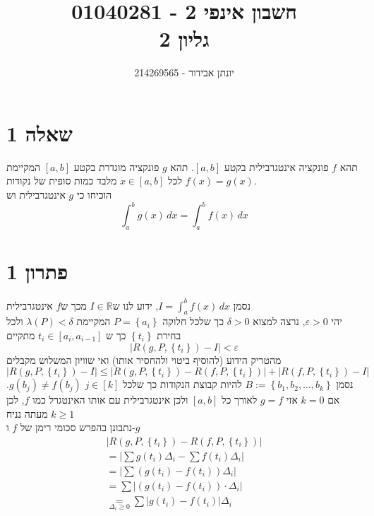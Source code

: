 \documentclass[12pt, titlepage]{article}
\title{חשבון אינפי 2 - 01040281 \\ גליון 2}
\author{יונתן אבידור - 214269565}
\begin{document}
\maketitle
\pagestyle{fancy}
\fancyhead{}
\part*{שאלה 1}
תהא $f$ פונקציה אינטגרבילית בקטע $\left[ a,b \right]$. תהא $g$ פונקציה מוגדרת בקטע $\left[ a,b \right]$ המקיימת $f\left( x \right)=g\left( x \right)$ לכל $x \in \left[ a,b \right]$ מלבד כמות סופית של נקודות.\\
הוכיחו כי $g$ אינטגרבילית וש
\[
	\int_{a}^{b} g\left( x \right)   \, dx =\int_{a}^{b} f\left( x \right)  \, dx 
    \]
\part*{פתרון 1}
נסמן $I=\int_{a}^{b} f\left( x \right) \, dx$, ידוע לנו ש$I\in \mathbb{R}$ מכך ש$f$ אינטגרבילית\\
יהי $\varepsilon>0$, נרצה למצוא $\delta>0$ כך שלכל חלוקה $P=\left\{ a_{i} \right\}$ המקיימת $\lambda \left( P \right)<\delta$ ולכל בחירת $\left\{ t_{i} \right\}$ כך ש $t_{i}\in \left[ a_{i},a_{i-1} \right]$ מתקיים
$$
\left| R\left( g,P,\left\{ t_{i} \right\}  \right) -I \right| <\varepsilon
$$
מהטריק הידוע (להוסיף ביטוי ולהחסיר אותו) ואי שוויון המשלוש מקבלים
$$
	\left| R\left( g,P,\left\{ t_{i} \right\}  \right)-I  \right| \leq \left| R\left( g,P,\left\{ t_{i} \right\}\right)  -R\left( f,P,\left\{ t_{i} \right\}   \right)  \right| + \left| R\left( f,P,\left\{ t_{i} \right\}  \right) -I \right| 
$$
נסמן $B:=\left\{ b_{1},b_{2},\ldots,b_{k} \right\}$ להיות קבוצת הנקודות כך שלכל $j\in \left[ k \right]$ $g\left( b_{j} \right)\neq f\left( b_{j} \right)$. אם $k=0$ אזי $g=f$ לאורך כל $\left[ a,b \right]$ ולכן אינטגרבילית עם אותו האינטגרל כמו $f$, לכן מעתה נניח $k\geq 1$\\
נתבונן בהפרש סכומי רימן של $f$ ו-$g$
\begin{gather*}
	\left| R\left(g, P,\left\{t_i\right\}\right) - R\left(f, P,\left\{t_i\right\}\right) \right|   \\
	= \left| \sum g\left( t_{i} \right) \Delta _{i}- \sum f\left( t_{i} \right) \Delta _{i} \right|  \\
        = \left| \sum \left( g\left( t_{i} \right) - f\left( t_{i} \right) \right) \Delta_{i}  \right|  \\
	= \sum \left| \left( g\left( t_{i}\right)-f\left( t_{i} \right)  \right) \cdot\Delta_{i} \right|  \\
        \underset{ \Delta_{i}\geq 0 }{ = } \sum \left| g\left( t_{i} \right) -f\left( t_{i} \right)  \right| \Delta_{i}
\end{gather*}
\end{document}
